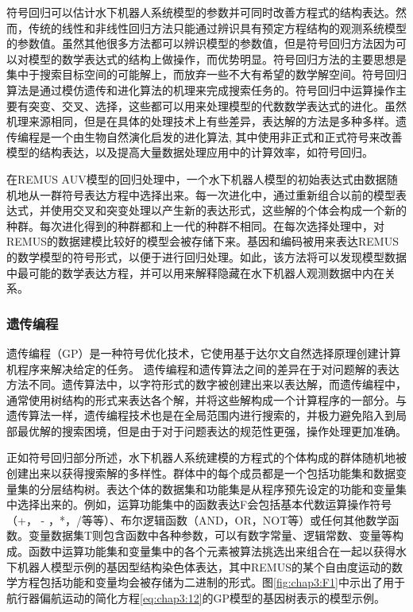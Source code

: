 符号回归可以估计水下机器人系统模型的参数并可同时改善方程式的结构表达。然而，传统的线性和非线性回归方法只能通过辨识具有预定方程结构的观测系统模型的参数值。虽然其他很多方法都可以辨识模型的参数值，但是符号回归方法因为可以对模型的数学表达式的结构上做操作，而优势明显。符号回归方法的主要思想是集中于搜索目标空间的可能解上，而放弃一些不大有希望的数学解空间。符号回归算法是通过模仿遗传和进化算法的机理来完成搜索任务的。符号回归中运算操作主要有突变、交叉、选择，这些都可以用来处理模型的代数数学表达式的进化。虽然机理来源相同，但是在具体的处理技术上有些差异，表达解的方法是多种多样\cite{dos2009nonlinear,Gandomi2012A1}。遗传编程是一个由生物自然演化启发的进化算法, 其中使用非正式和正式符号来改善模型的结构表达，以及提高大量数据处理应用中的计算效率，如符号回归。

在REMUS AUV模型的回归处理中，一个水下机器人模型的初始表达式由数据随机地从一群符号表达方程中选择出来。每一次进化中，通过重新组合以前的模型表达式，并使用交叉和突变处理以产生新的表达形式，这些解的个体会构成一个新的种群。每次进化得到的种群都和上一代的种群不相同。在每次选择处理中，对REMUS的数据建模比较好的模型会被存储下来。基因和编码被用来表达REMUS的数学模型的符号形式，以便于进行回归处理。如此，该方法将可以发现模型数据中最可能的数学表达方程，并可以用来解释隐藏在水下机器人观测数据中内在关系。

\subsubsection{遗传编程 }

遗传编程（GP）是一种符号优化技术，它使用基于达尔文自然选择原理创建计算机程序来解决给定的任务\cite{schmidt2009distilling,dos2014genetic,feng2006identification,garg2014mathematical}。 遗传编程和遗传算法之间的差异在于对问题解的表达方法不同。遗传算法中，以字符形式的数字被创建出来以表达解，而遗传编程中，通常使用树结构的形式来表达各个解，并将这些解构成一个计算程序的一部分。与遗传算法一样，遗传编程技术也是在全局范围内进行搜索的，并极力避免陷入到局部最优解的搜索困境，但是由于对于问题表达的规范性更强，操作处理更加准确。

正如符号回归部分所述，水下机器人系统建模的方程式的个体构成的群体随机地被创建出来以获得搜索解的多样性。群体中的每个成员都是一个包括功能集和数据变量集的分层结构树。表达个体的数据集和功能集是从程序预先设定的功能和变量集中选择出来的。例如，运算功能集中的函数表达F会包括基本代数运算操作符号（+， - ，*，/等等）、布尔逻辑函数（AND，OR，NOT等）或任何其他数学函数。变量数据集T则包含函数中各种参数，可以有数字常量、逻辑常数、变量等构成。函数中运算功能集和变量集中的各个元素被算法挑选出来组合在一起以获得水下机器人模型示例的基因型结构染色体表达，其中REMUS的某个自由度运动的数学方程包括功能和变量均会被存储为二进制的形式。图\ref{fig:chap3:F1}中示出了用于航行器偏航运动的简化方程\ref{eq:chap3:12}的GP模型的基因树表示的模型示例。

